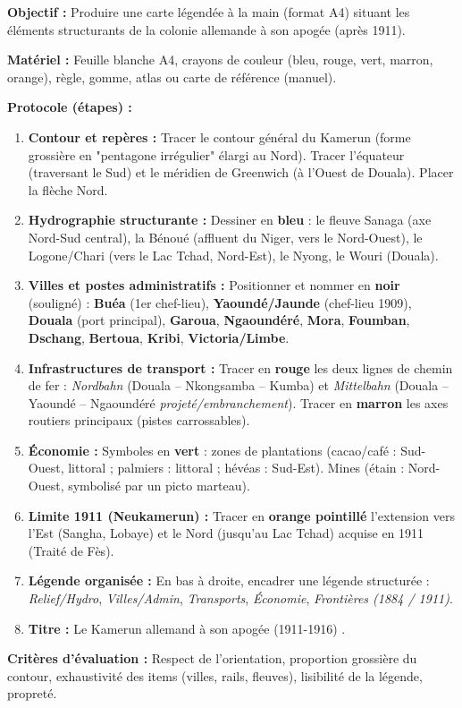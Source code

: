 \documentclass[11pt]{article}
\begin{document}
\begin{experience}
\textbf{Objectif :} Produire une carte légendée à la main (format A4) situant les éléments structurants de la colonie allemande à son apogée (après 1911).

\textbf{Matériel :} Feuille blanche A4, crayons de couleur (bleu, rouge, vert, marron, orange), règle, gomme, atlas ou carte de référence (manuel).

\textbf{Protocole (étapes) :}
\begin{enumerate}
    \item \textbf{Contour et repères :} Tracer le contour général du Kamerun (forme grossière en "pentagone irrégulier" élargi au Nord). Tracer l'équateur (traversant le Sud) et le méridien de Greenwich (à l'Ouest de Douala). Placer la flèche Nord.
    \item \textbf{Hydrographie structurante :} Dessiner en \textbf{bleu} : le fleuve Sanaga (axe Nord-Sud central), la Bénoué (affluent du Niger, vers le Nord-Ouest), le Logone/Chari (vers le Lac Tchad, Nord-Est), le Nyong, le Wouri (Douala).
    \item \textbf{Villes et postes administratifs :} Positionner et nommer en \textbf{noir} (souligné) : \textbf{Buéa} (1er chef-lieu), \textbf{Yaoundé/Jaunde} (chef-lieu 1909), \textbf{Douala} (port principal), \textbf{Garoua}, \textbf{Ngaoundéré}, \textbf{Mora}, \textbf{Foumban}, \textbf{Dschang}, \textbf{Bertoua}, \textbf{Kribi}, \textbf{Victoria/Limbe}.
    \item \textbf{Infrastructures de transport :} Tracer en \textbf{rouge} les deux lignes de chemin de fer : \emph{Nordbahn} (Douala -- Nkongsamba -- Kumba) et \emph{Mittelbahn} (Douala -- Yaoundé -- Ngaoundéré \emph{projeté/embranchement}). Tracer en \textbf{marron} les axes routiers principaux (pistes carrossables).
    \item \textbf{Économie :} Symboles en \textbf{vert} : zones de plantations (cacao/café : Sud-Ouest, littoral ; palmiers : littoral ; hévéas : Sud-Est). Mines (étain : Nord-Ouest, symbolisé par un picto marteau).
    \item \textbf{Limite 1911 (Neukamerun) :} Tracer en \textbf{orange pointillé} l'extension vers l'Est (Sangha, Lobaye) et le Nord (jusqu'au Lac Tchad) acquise en 1911 (Traité de Fès).
    \item \textbf{Légende organisée :} En bas à droite, encadrer une légende structurée : \textit{Relief/Hydro}, \textit{Villes/Admin}, \textit{Transports}, \textit{Économie}, \textit{Frontières (1884 / 1911)}.
    \item \textbf{Titre :} \og Le Kamerun allemand à son apogée (1911-1916) \fg.
\end{enumerate}

\textbf{Critères d'évaluation :} Respect de l'orientation, proportion grossière du contour, exhaustivité des items (villes, rails, fleuves), lisibilité de la légende, propreté.
\end{experience}
\end{document}
